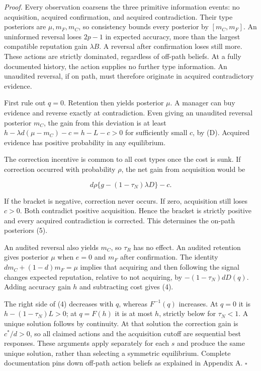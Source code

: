 \documentclass[
  11pt,
]{article}
\begin{document}
\emph{Proof.} Every observation coarsens the three primitive information
events: no acquisition, acquired confirmation, and acquired
contradiction. Their type posteriors are \(\mu,m_F,m_C\), so consistency
bounds every posterior by \([m_C,m_F]\). An uninformed reversal loses
\(2p-1\) in expected accuracy, more than the largest compatible
reputation gain \(\lambda B\). A reversal after confirmation loses still
more. These actions are strictly dominated, regardless of off-path
beliefs. At a fully documented history, the action supplies no further
type information. An unaudited reversal, if on path, must therefore
originate in acquired contradictory evidence.

First rule out \(q=0\). Retention then yields posterior \(\mu\). A
manager can buy evidence and reverse exactly at contradiction. Even
giving an unaudited reversal posterior \(m_C\), the gain from this
deviation is at least \(h-\lambda d(\mu-m_C)-c=h-L-c>0\) for
sufficiently small \(c\), by (D). Acquired evidence has positive
probability in any equilibrium.

The correction incentive is common to all cost types once the cost is
sunk. If correction occurred with probability \(\rho\), the net gain
from acquisition would be

\[d\rho\{g-(1-\tau_N)\lambda D\}-c.\tag{6}\]

If the bracket is negative, correction never occurs. If zero,
acquisition still loses \(c>0\). Both contradict positive acquisition.
Hence the bracket is strictly positive and every acquired contradiction
is corrected. This determines the on-path posteriors (5).

An audited reversal also yields \(m_C\), so \(\tau_R\) has no effect. An
audited retention gives posterior \(\mu\) when \(e=0\) and \(m_F\) after
confirmation. The identity \(dm_C+(1-d)m_F=\mu\) implies that acquiring
and then following the signal changes expected reputation, relative to
not acquiring, by \(-(1-\tau_N)dD(q)\). Adding accuracy gain \(h\) and
subtracting cost gives (4).

The right side of (4) decreases with \(q\), whereas \(F^{-1}(q)\)
increases. At \(q=0\) it is \(h-(1-\tau_N)L>0\); at \(q=F(h)\) it is at
most \(h\), strictly below for \(\tau_N<1\). A unique solution follows
by continuity. At that solution the correction gain is \(c^*/d>0\), so
all claimed actions and the acquisition cutoff are sequential best
responses. These arguments apply separately for each \(s\) and produce
the same unique solution, rather than selecting a symmetric equilibrium.
Complete documentation pins down off-path action beliefs as explained in
Appendix A. \(\square\)
\end{document}
